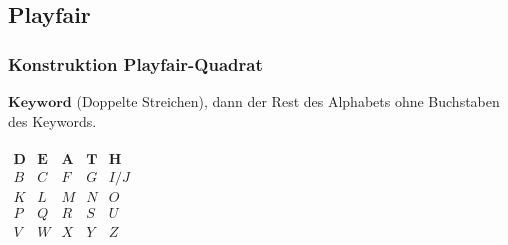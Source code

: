 \documentclass[landscape,twocolumn,a4paper]{article}
\begin{document}
\subsection{Playfair}
\subsubsection{Konstruktion Playfair-Quadrat}
$\mathbf{Keyword}$ (Doppelte Streichen), dann der Rest des Alphabets ohne Buchstaben des Keywords.\\\\
$\begin{matrix}
\mathbf{D} & \mathbf{E} & \mathbf{A} & \mathbf{T} & \mathbf{H} \\
B & C & F & G & I/J \\
K & L & M & N & O \\
P & Q & R & S & U \\
V & W & X & Y & Z \\
\end{matrix}$
\end{document}
